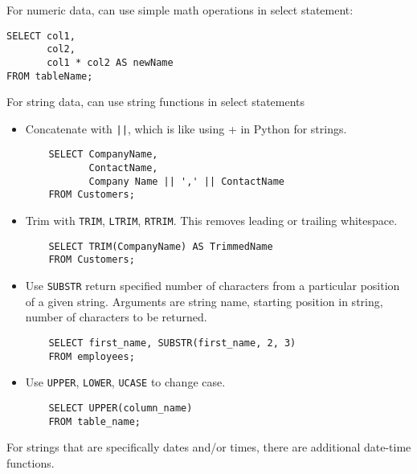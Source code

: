 \documentclass[12pt]{article}
\theoremstyle{plain}
\theoremstyle{definition}
\theoremstyle{remark}
\begin{document}
For numeric data, can use simple math operations in select statement:
\begin{lstlisting}
SELECT col1,
       col2,
       col1 * col2 AS newName
FROM tableName;
\end{lstlisting}
For string data, can use string functions in select statements
\begin{itemize}
  \item
    Concatenate with \texttt{||}, which is like using + in Python for
    strings.
    \begin{lstlisting}
    SELECT CompanyName,
           ContactName,
           Company Name || ',' || ContactName
    FROM Customers;
    \end{lstlisting}

  \item
    Trim with \texttt{TRIM}, \texttt{LTRIM}, \texttt{RTRIM}.
    This removes leading or trailing whitespace.
    \begin{lstlisting}
    SELECT TRIM(CompanyName) AS TrimmedName
    FROM Customers;
    \end{lstlisting}

  \item
    Use \texttt{SUBSTR} return specified number of characters from a
    particular position of a given string.
    Arguments are string name, starting position in string, number of
    characters to be returned.
    \begin{lstlisting}
    SELECT first_name, SUBSTR(first_name, 2, 3)
    FROM employees;
    \end{lstlisting}

  \item
    Use \texttt{UPPER}, \texttt{LOWER}, \texttt{UCASE} to change case.
    \begin{lstlisting}
    SELECT UPPER(column_name)
    FROM table_name;
    \end{lstlisting}
\end{itemize}
For strings that are specifically dates and/or times, there are
additional date-time functions.
\end{document}
